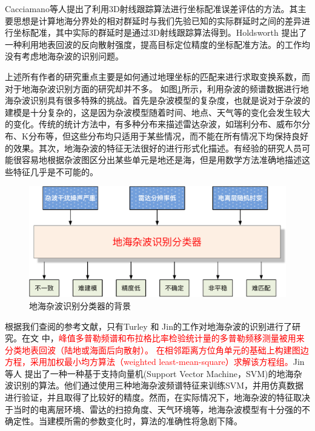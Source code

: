 Cacciamano\cite{cacciamano2012coordinate}等人提出了利用3D射线跟踪算法进行坐标配准误差评估的方法。其主要思想是计算地海分界处的相对群延时与我们先验已知的实际群延时之间的差异进行坐标配准，其中实际的群延时是通过3D射线跟踪算法得到。Holdsworth \cite{holdsworth2017skywave} 提出了一种利用地表回波的反向散射强度，提高目标定位精度的坐标配准方法。\cite{weijers1995oth, fabrizio2016using, wheadon1994ionospheric, anderson1995auto, cuccoli2009over, cuccoli2009over2, cuccoli2010sea, cuccoli2011coordinate, cacciamano2012coordinate}的工作均没有考虑地海杂波的识别问题。


上述所有作者的研究重点主要是如何通过地理坐标的匹配来进行求取变换系数，而对于地海杂波识别方面的研究却并不多。
如图\ref{fig:clutterproblem}所示，利用杂波的频谱数据进行地海杂波识别具有很多特殊的挑战。首先是杂波模型的复杂度，也就是说对于杂波的建模是十分复杂的，这是因为杂波模型随着时间、地点、天气等的变化会发生较大的变化。传统的统计方法中，有多种分布来描述雷达杂波，如瑞利分布、威布尔分布、K分布等，但这些分布均只适用于某些情况，而不能在所有情况下均保持良好的效果。其次，地海杂波的特征无法很好的进行形式化描述。有经验的研究人员可能很容易地根据杂波图区分出某些单元是地还是海，但是用数学方法准确地描述这些特征几乎是不可能的。
\begin{figure}[H]
	\centering
	\includegraphics[width=\textwidth]{figures/othr/othr_classification.pdf}
	\caption{地海杂波识别分类器的背景}
	\label{fig:clutterproblem}
\end{figure}
根据我们查阅的参考文献，只有Turley\cite{turley2013high} 和 Jin\cite{jin2012svm}的工作对地海杂波的识别进行了研究。在文 \cite{turley2013high}中，\textcolor{red}{峰值多普勒频谱和布拉格比率检验统计量的多普勒频移测量被用来分类地表回波（陆地或海面后向散射）。 在相邻距离方位角单元的基础上构建图边方程，采用加权最小均方算法（weighted least-mean-square）求解该方程组。}Jin等人\cite{jin2012svm} 提出了一种一种基于支持向量机(Support Vector Machine，SVM)的地海杂波识别的算法。他们通过使用三种地海杂波频谱特征来训练SVM，并用仿真数据进行验证，并且取得了比较好的精度。然而，在实际情况下，地海杂波的特征取决于当时的电离层环境、雷达的扫掠角度、天气环境等，地海杂波模型有十分强的不确定性。当建模所需的参数变化时，算法的准确性将急剧下降。


